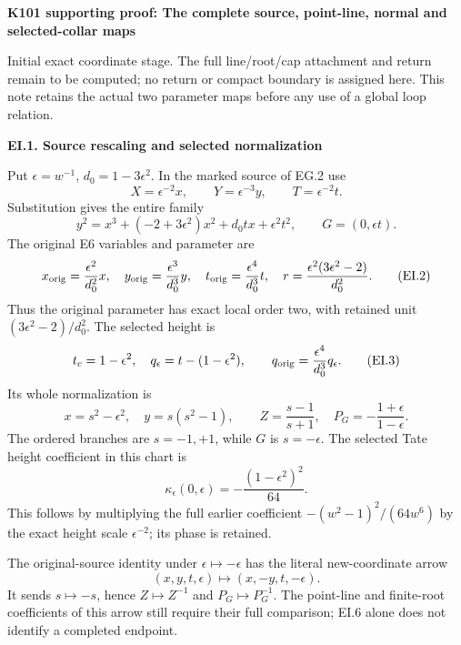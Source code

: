 \par\bigskip\noindent\textbf{K101 supporting proof: The complete source, point-line, normal and selected-collar maps}\par\nobreak
Initial exact coordinate stage. The full line/root/cap attachment and
return remain to be computed; no return or compact boundary is assigned
here. This note retains the actual two parameter maps before any use of
a global loop relation.

\par

\medskip\noindent\textbf{EI.1. Source rescaling and selected normalization}

\par\nobreak

Put \(\epsilon=w^{-1}\), \(d_0=1-3\epsilon^2\).
In the marked source of EG.2 use
\[
 X=\epsilon^{-2}x,\qquad Y=\epsilon^{-3}y,\qquad
 T=\epsilon^{-2}t.
\]
Substitution gives the entire family
\[
 y^2=x^3+(-2+3\epsilon^2)x^2+d_0tx+\epsilon^2t^2,
 \qquad G=(0,\epsilon t).
 \tag{EI.1}
\]
The original E6 variables and parameter are
\[
 x_{\rm orig}=\frac{\epsilon^2}{d_0^2}x,\quad
 y_{\rm orig}=\frac{\epsilon^3}{d_0^3}y,\quad
 t_{\rm orig}=\frac{\epsilon^4}{d_0^3}t,\quad
 r=\frac{\epsilon^2(3\epsilon^2-2)}{d_0^2}.
 \tag{EI.2}
\]
Thus the original parameter has exact local order two, with retained
unit \((3\epsilon^2-2)/d_0^2\). The selected height is
\[
 t_c=1-\epsilon^2,\quad q_\epsilon=t-(1-\epsilon^2),\qquad
 q_{\rm orig}=\frac{\epsilon^4}{d_0^3}q_\epsilon.
 \tag{EI.3}
\]
Its whole normalization is
\[
 x=s^2-\epsilon^2,\quad y=s(s^2-1),\qquad
 Z=\frac{s-1}{s+1},\quad
 P_G=-\frac{1+\epsilon}{1-\epsilon}.
 \tag{EI.4}
\]
The ordered branches are \(s=-1,+1\), while \(G\) is \(s=-\epsilon\).
The selected Tate height coefficient in this chart is
\[
 \kappa_\epsilon(0,\epsilon)
       =-\frac{(1-\epsilon^2)^2}{64}.
 \tag{EI.5}
\]
This follows by multiplying the full earlier coefficient
\(- (w^2-1)^2/(64w^6)\) by the exact height scale
\(\epsilon^{-2}\); its phase is retained.

The original-source identity under \(\epsilon\mapsto-\epsilon\)
has the literal new-coordinate arrow
\[
 (x,y,t,\epsilon)\longmapsto(x,-y,t,-\epsilon).
 \tag{EI.6}
\]
It sends \(s\mapsto-s\), hence \(Z\mapsto Z^{-1}\) and
\(P_G\mapsto P_G^{-1}\). The point-line and finite-root coefficients
of this arrow still require their full comparison; EI.6 alone
does not identify a completed endpoint.

\par

